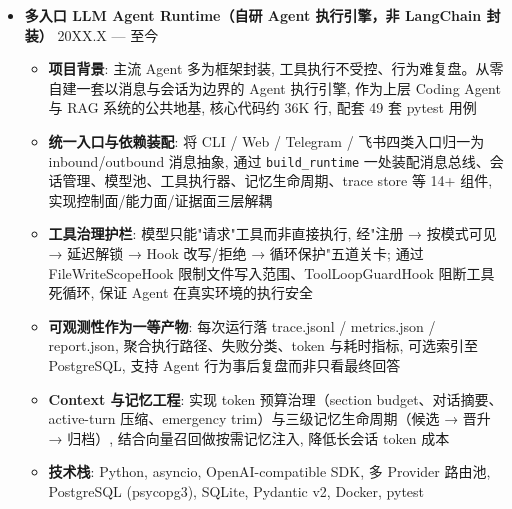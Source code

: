 \documentclass[zh]{resume}
\begin{document}
\begin{itemize}
    \item \textbf{多入口 LLM Agent Runtime（自研 Agent 执行引擎，非 LangChain 封装）} \hfill 20XX.X --- 至今
    \begin{itemize}
        \item \textbf{项目背景}: 主流 Agent 多为框架封装, 工具执行不受控、行为难复盘。从零自建一套以消息与会话为边界的 Agent 执行引擎, 作为上层 Coding Agent 与 RAG 系统的公共地基, 核心代码约 36K 行, 配套 49 套 pytest 用例
        \item \textbf{统一入口与依赖装配}: 将 CLI / Web / Telegram / 飞书四类入口归一为 inbound/outbound 消息抽象, 通过 \texttt{build\_runtime} 一处装配消息总线、会话管理、模型池、工具执行器、记忆生命周期、trace store 等 14+ 组件, 实现控制面/能力面/证据面三层解耦
        \item \textbf{工具治理护栏}: 模型只能"请求"工具而非直接执行, 经"注册 → 按模式可见 → 延迟解锁 → Hook 改写/拒绝 → 循环保护"五道关卡; 通过 FileWriteScopeHook 限制文件写入范围、ToolLoopGuardHook 阻断工具死循环, 保证 Agent 在真实环境的执行安全
        \item \textbf{可观测性作为一等产物}: 每次运行落 trace.jsonl / metrics.json / report.json, 聚合执行路径、失败分类、token 与耗时指标, 可选索引至 PostgreSQL, 支持 Agent 行为事后复盘而非只看最终回答
        \item \textbf{Context 与记忆工程}: 实现 token 预算治理（section budget、对话摘要、active-turn 压缩、emergency trim）与三级记忆生命周期（候选 → 晋升 → 归档）, 结合向量召回做按需记忆注入, 降低长会话 token 成本
        \item \textbf{技术栈}: Python, asyncio, OpenAI-compatible SDK, 多 Provider 路由池, PostgreSQL (psycopg3), SQLite, Pydantic v2, Docker, pytest
    \end{itemize}


\end{itemize}
\end{document}

